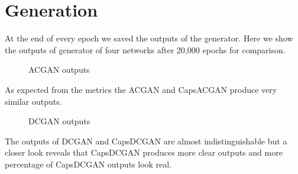 \section{Generation} %
\label{sec:generation}
At the end of every epoch we saved the outputs of the generator. Here we show the outputs of generator of four networks after 20,000 epochs for comparison.
\begin{figure}[H]
    \centering
    \qquad
    \caption{ACGAN outputs}%
    \label{fig:acgan_gen}%
\end{figure}
As expected from the metrics the ACGAN and CapsACGAN produce very similar outputs.
\begin{figure}[H]
    \centering
    \qquad
    \caption{DCGAN outputs}%
    \label{fig:dcgan_gen}%
\end{figure}
The outputs of DCGAN and CapsDCGAN are almost indistinguishable but a closer look reveals that CapsDCGAN produces more clear outputs and more percentage of CapsDCGAN outputs look real.

